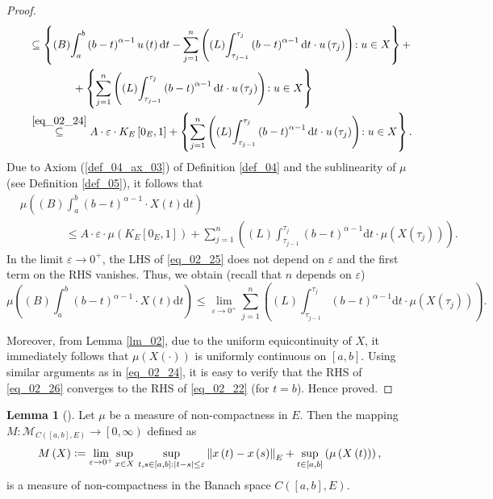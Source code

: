 \documentclass[reqno]{amsart}
\numberwithin{equation}{section}
\theoremstyle{definition}
\newtheorem{lemma}{Lemma}
\theoremstyle{remark}
\newcommand{\axiomRef}[1]{\textrm{Axiom (\ref{#1})}}
\newcommand{\ball}[3]{K_{#1}\sbr{#2,#3}}
\newcommand{\Bint}[3]{\br{B}\!\displaystyle\int_{#1}^{#2}{#3}}
\newcommand{\br}[1]{\left(#1\right)}
\newcommand{\C}[2]{C\br{#1,#2}}
\newcommand{\cbr}[1]{\left\{#1\right\}}
\newcommand{\definitionRef}[1]{\textrm{Definition \ref{#1}}}
\newcommand{\defeq}{\vcentcolon=}
\newcommand{\dt}{\mathrm{d}t}
\newcommand{\eps}{\varepsilon}
\newcommand{\fM}{\mathcal{M}}
\newcommand{\lemmaRef}[1]{\textrm{Lemma \ref{#1}}}
\newcommand{\Lint}[3]{\br{L}\!\displaystyle\int_{#1}^{#2}{#3}}
\newcommand{\lsrbr}[1]{\left[#1\right)}
\newcommand{\sbr}[1]{\left[#1\right]}
\newcommand{\st}{\!:}
\newcommand{\subseteqText}[1]{\stackrel{#1}{\subseteq}}
\begin{document}
\begin{proof}
\begin{equation*}
\begin{aligned}
			&\qquad\subseteq\cbr{\Bint{a}{b}{\br{b-t}^{\alpha-1}u\br{t}\dt}-\sum_{j=1}^n\br{\Lint{\tau_{j-1}}{\tau_j}{\br{b-t}^{\alpha-1}\dt}\cdot{u}\br{\tau_j}}\st{u}\in{X}}+\\
			&\qquad\qquad\qquad+\cbr{\sum_{j=1}^n\br{\Lint{\tau_{j-1}}{\tau_j}{\br{b-t}^{\alpha-1}\dt}\cdot{u}\br{\tau_j}}\st{u}\in{X}}\\
			&\qquad\subseteqText{\eqref{eq_02_24}}A\cdot\eps\cdot\ball{E}{0_E}{1}+\cbr{\sum_{j=1}^n\br{\Lint{\tau_{j-1}}{\tau_j}{\br{b-t}^{\alpha-1}\dt}\cdot{u}\br{\tau_j}}\st{u}\in{X}}.
		\end{aligned}
	\end{equation*}
	Due to \axiomRef{def_04_ax_03} of \definitionRef{def_04} and the sublinearity of $\mu$ (see \definitionRef{def_05}), it follows that
	\begin{equation}\label{eq_02_25}
		\begin{aligned}
			&\mu\br{\Bint{a}{b}{\br{b-t}^{\alpha-1}\cdot{X}\br{t}\dt}}\\
			&\qquad\qquad\leq{A}\cdot\eps\cdot\mu\br{\ball{E}{0_E}{1}}+\sum_{j=1}^n\br{\Lint{\tau_{j-1}}{\tau_j}{\br{b-t}^{\alpha-1}\dt}\cdot\mu\br{X\br{\tau_j}}}.
		\end{aligned}
	\end{equation}
	In the limit $\eps\rightarrow0^+$, the LHS of \eqref{eq_02_25} does not depend on $\eps$ and the first term on the RHS vanishes. Thus, we obtain (recall that $n$ depends on $\eps$)
	\begin{equation}\label{eq_02_26}
		\mu\br{\Bint{a}{b}{\br{b-t}^{\alpha-1}\cdot{X}\br{t}\dt}}\leq\lim_{\eps\rightarrow0^+}\sum_{j=1}^n\br{\Lint{\tau_{j-1}}{\tau_j}{\br{b-t}^{\alpha-1}\dt}\cdot\mu\br{X\br{\tau_j}}}.
	\end{equation}
	
	Moreover, from \lemmaRef{lm_02}, due to the uniform equicontinuity of $X$, it immediately follows that $\mu\br{X\br{\cdot}}$ is uniformly continuous on $\sbr{a,b}$. Using similar arguments as in \eqref{eq_02_24}, it is easy to verify that the RHS of \eqref{eq_02_26} converges to the RHS of \eqref{eq_02_22} (for $t=b$). Hence proved.
	\end{proof}

	\begin{lemma}[]\label{lm_04}
		Let $\mu$ be a measure of non-compactness in $E$. Then the mapping $M\st\fM_{\C{\sbr{a,b}}{E}}\rightarrow\lsrbr{0,\infty}$ defined as
		\begin{equation*}
			M\br{X}\defeq\lim_{\eps\rightarrow0^+}\sup_{x\in{X}}\,\sup_{t,s\in\sbr{a,b}\,\st\abs{t-s}\leq\eps}\norm{x\br{t}-x\br{s}}_E+\sup_{t\in\sbr{a,b}}\br{\mu\br{X\br{t}}},
		\end{equation*}
		is a measure of non-compactness in the Banach space $\C{\sbr{a,b}}{E}$.
	\end{lemma}
	
\end{document}
